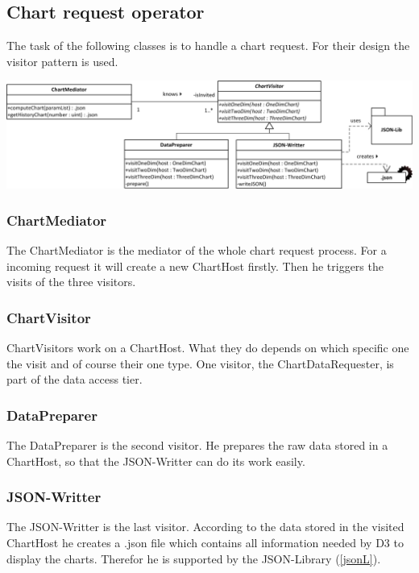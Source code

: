 \subsection{Chart request operator}
The task of the following classes is to handle a chart request. For their design the visitor pattern
is used. 

\begin{center}
\includegraphics[width=1\linewidth]{Pictures/Parts/MediVisi.png}
\end{center}  

\subsubsection*{ChartMediator}
The ChartMediator is the mediator of the whole chart request process. For a incoming request it will create a new
ChartHost firstly. Then he triggers the visits of the three visitors. 


\subsubsection*{ChartVisitor}
ChartVisitors work on a ChartHost. What they do depends on which specific one the visit and of course their
one type. One visitor, the ChartDataRequester, is part of the data access tier.


\subsubsection*{DataPreparer}
The DataPreparer is the second visitor. He prepares the raw data stored in a ChartHost, so that the JSON-Writter
can do its work easily.


\subsubsection*{JSON-Writter}
The JSON-Writter is the last visitor. According to the data stored in the visited ChartHost he creates a .json file
which contains all information needed by D3 to display the charts. Therefor he is supported by the JSON-Library
 (\ref{jsonL}).


